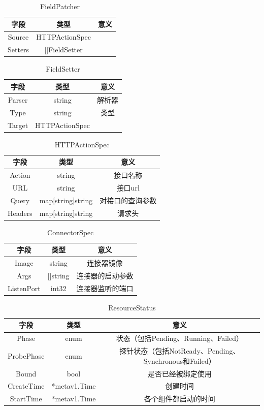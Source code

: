 \documentclass[12pt,a4paper]{article}
\begin{document}
\begin{table}[!htbp]
\centering
\begin{tabular}{ccc}
  \toprule
  字段& 类型& 意义\\
  \midrule
  Source& HTTPActionSpec&  \\
  Setters& []FieldSetter&  \\
  \bottomrule
\end{tabular}
\caption{FieldPatcher}
\end{table}

\begin{table}[!htbp]
\centering
\begin{tabular}{ccc}
  \toprule
  字段& 类型& 意义\\
  \midrule
  Parser& string& 解析器\\
  Type& string& 类型\\
  Target& HTTPActionSpec& \\
  \bottomrule
\end{tabular}
\caption{FieldSetter}
\end{table}

\begin{table}[!htbp]
\centering
\begin{tabular}{ccc}
  \toprule
  字段& 类型& 意义\\
  \midrule
  Action& string& 接口名称\\
  URL& string& 接口url\\
  Query& map[string]string& 对接口的查询参数\\
  Headers& map[string]string& 请求头\\
  \bottomrule
\end{tabular}
\caption{HTTPActionSpec}
\end{table}

\begin{table}[!htbp]
\centering
\begin{tabular}{ccc}
  \toprule
  字段& 类型& 意义\\
  \midrule
  Image& string& 连接器镜像\\
  Args& []string& 连接器的启动参数\\
  ListenPort& int32& 连接器监听的端口\\
  \bottomrule
\end{tabular}
\caption{ConnectorSpec}
\end{table}

\begin{table}[!htbp]
\centering
\begin{tabular}{ccc}
  \toprule
  字段& 类型& 意义\\
  \midrule
  Phase& enum& 状态（包括Pending、Running、Failed）\\
  ProbePhase& enum& 探针状态（包括NotReady、Pending、Synchronous和Failed）\\
  Bound& bool& 是否已经被绑定使用\\
  CreateTime& *metav1.Time& 创建时间\\
  StartTime& *metav1.Time& 各个组件都启动的时间\\
  \bottomrule
\end{tabular}
\caption{ResourceStatus}
\end{table}
\end{document}
